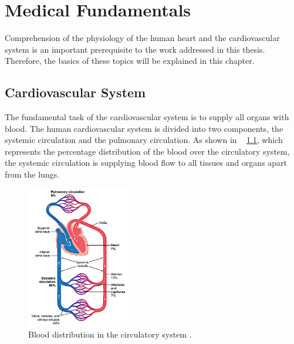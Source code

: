 \chapter{Medical Fundamentals}
Comprehension of the physiology of the human heart and the cardiovascular system is an important prerequisite to the work addressed in this thesis. Therefore, the basics of these topics will be explained in this chapter.

\section{Cardiovascular System}
The fundamental task of the cardiovascular system is to supply all organs with blood. The human cardiovascular system is divided into two components, the systemic circulation and the pulmonary circulation. As shown in \figurename~ \ref{fig:circulation}, which represents the percentage distribution of the blood over the circulatory system, the systemic circulation is supplying blood flow to all tissues and organs apart from the lungs. \cite{GH20}
\begin{figure}[h]
  \centering
  \includegraphics[width=0.4\textwidth, height=0.6\textwidth]{images/circulation.jpg}
  \caption{Blood distribution in the circulatory system \cite{GH20}.}
  \label{fig:circulation}
\end{figure}
